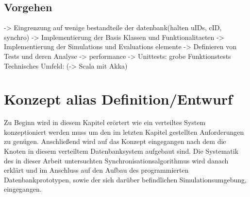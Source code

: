 \documentclass[a4paper,11pt,oneside,%
headsepline,												%
footsepline,												%
bibtotocnumbered									%
]{scrreprt}
\begin{document}
\section{Vorgehen}
-> Eingrenzung auf wenige bestandteile der datenbank(halten uIDs, cID, synchro)
-> Implementierung der Basis Klassen und Funktionalitaeten 
-> Implementierung der Simulations und Evaluations elemente
-> Definieren von Tests und deren Analyse
-> performance
-> Unittests: grobe Funktionstests 
Technisches Umfeld:
(-> Scala mit Akka)






\chapter{Konzept alias Definition/Entwurf}
Zu Beginn wird in diesem Kapitel erörtert wie ein verteiltes System konzeptioniert werden muss um den im letzten Kapitel gestellten Anforderungen zu genügen. Anschließend wird auf das Konzept eingegangen nach dem die Knoten in diesem verteiltem Datenbanksystem aufgebaut sind. Die Systematik des in dieser Arbeit untersuchten Synchronisationsalgorithmus wird danach erklärt und im Anschluss auf den Aufbau des programmierten Datenbankprototypen, sowie der sich darüber befindlichen Simulationsumgebung, eingegangen.
\end{document}
